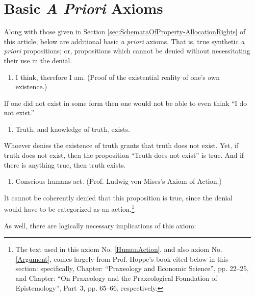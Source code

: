 \documentclass[letterpaper,12pt]{article}
\begin{document}
\section{Basic \emph{A Priori} Axioms}
\label{sec:BasicAPrioriAxioms}

Along with those given in Section \ref{sec:SchemataOfProperty-AllocationRights} of this article, below are additional basic \emph{a priori} axioms. That is, true synthetic \emph{a priori} propositions; or, propositions which cannot be denied without necessitating their use in the denial.

\begin{enumerate}
\small
\item I think, therefore I am. (Proof of the existential reality of one's own existence.)
\end{enumerate}

If one did not exist in some form then one would not be able to even think ``I do not exist.''

\begin{enumerate}
\small
\setcounter{enumi}{1}
\item\label{TruthExists} Truth, and knowledge of truth, exists.
\end{enumerate}

Whoever denies the existence of truth grants that truth does not exist. Yet, if truth does not exist, then the proposition ``Truth does not exist'' is true. And if there is anything true, then truth exists.

\begin{enumerate}
\small
\setcounter{enumi}{2}
\item\label{HumanAction} Conscious humans act. (Prof. Ludwig von Mises's Axiom of Action.)
\end{enumerate}

It cannot be coherently denied that this proposition is true, since the denial would have to be categorized as an action.\footnote{The text used in this axiom No. \ref{HumanAction}, and also axiom No. \ref{Argument}, comes largely from Prof. Hoppe's book cited below in this section: specifically, Chapter: ``Praxeology and Economic Science'', pp. 22--25, and Chapter: ``On Praxeology and the Praxeological Foundation of Epistemology'', Part~3, pp. 65--66, respectively.}

As well, there are logically necessary implications of this axiom:
\end{document}
